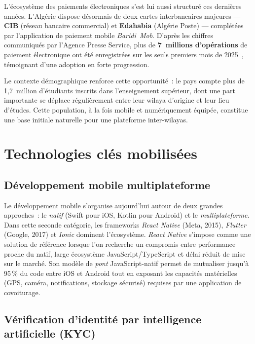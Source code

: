 L'écosystème des paiements électroniques s'est lui aussi structuré ces dernières années. L'Algérie dispose désormais de deux cartes interbancaires majeures --- \textbf{CIB} (réseau bancaire commercial) et \textbf{Edahabia} (Algérie Poste) --- complétées par l'application de paiement mobile \textit{Baridi~Mob}. D'après les chiffres communiqués par l'Agence Presse Service, plus de \textbf{7~millions d'opérations} de paiement électronique ont été enregistrées sur les seuls premiers mois de 2025~\cite{aps_epaiement_2025}, témoignant d'une adoption en forte progression.

Le contexte démographique renforce cette opportunité~: le pays compte plus de 1,7~million d'étudiants inscrits dans l'enseignement supérieur, dont une part importante se déplace régulièrement entre leur wilaya d'origine et leur lieu d'études. Cette population, à la fois mobile et numériquement équipée, constitue une base initiale naturelle pour une plateforme inter-wilayas.

\section{Technologies clés mobilisées}
\label{sec:technologies}

\subsection{Développement mobile multiplateforme}

Le développement mobile s'organise aujourd'hui autour de deux grandes approches~: le \textit{natif} (Swift pour iOS, Kotlin pour Android) et le \textit{multiplateforme}. Dans cette seconde catégorie, les frameworks \textit{React Native} (Meta, 2015), \textit{Flutter} (Google, 2017) et \textit{Ionic} dominent l'écosystème. \textit{React Native} s'impose comme une solution de référence lorsque l'on recherche un compromis entre performance proche du natif, large écosystème JavaScript/TypeScript et délai réduit de mise sur le marché. Son modèle de \textit{pont} JavaScript-natif permet de mutualiser jusqu'à 95\,\% du code entre iOS et Android tout en exposant les capacités matérielles (GPS, caméra, notifications, stockage sécurisé) requises par une application de covoiturage.

\subsection{Vérification d'identité par intelligence artificielle (KYC)}

